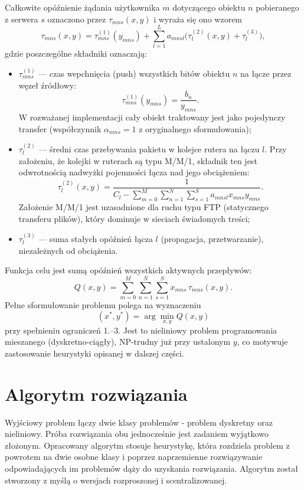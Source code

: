 \documentclass{article}
\begin{document}
Całkowite opóźnienie żądania użytkownika $m$ dotyczącego obiektu $n$ pobieranego z serwera $s$ oznaczono przez $\tau_{mns}(x,y)$ i wyraża się ono wzorem
\[
\tau_{mns}(x,y) = \tau^{(1)}_{mns}(y_{mns}) + \sum_{l=1}^L a_{mnsl}\Big(\tau^{(2)}_l(x,y) + \tau^{(3)}_l\Big),
\]
gdzie poszczególne składniki oznaczają:
\begin{itemize}
    \item $\tau^{(1)}_{mns}$ — czas wepchnięcia (push) wszystkich bitów obiektu $n$ na łącze przez węzeł źródłowy:
        \[\tau^{(1)}_{mns}(y_{mns}) = \frac{b_n}{y_{mns}}.\]
        W rozważanej implementacji cały obiekt traktowany jest jako pojedynczy transfer (współczynnik $\alpha_{mns}=1$ z oryginalnego sformułowania);
    \item $\tau^{(2)}_l$ — średni czas przebywania pakietu w kolejce rutera na łączu $l$. Przy założeniu, że kolejki w ruterach są typu M/M/1, składnik ten jest odwrotnością nadwyżki pojemności łącza nad jego obciążeniem:
        \[\tau^{(2)}_l(x,y) = \frac{1}{C_l - \sum^M_{m=0}\sum^N_{n=1}\sum^S_{s=1}a_{mnsl}x_{mns}y_{mns}}.\]
        Założenie M/M/1 jest uzasadnione dla ruchu typu FTP (statycznego transferu plików), który dominuje w sieciach świadomych treści;
    \item $\tau^{(3)}_l$ — suma stałych opóźnień łącza $l$ (propagacja, przetwarzanie), niezależnych od obciążenia.
\end{itemize}

Funkcja celu jest sumą opóźnień wszystkich aktywnych przepływów:
\[
Q(x,y) = \sum^M_{m=0}\sum^N_{n=1}\sum^S_{s=1}x_{mns}\,\tau_{mns}(x,y).
\]
Pełne sformułowanie problemu polega na wyznaczeniu
\[
(x^*,y^*) = \arg\min_{x,y} Q(x,y)
\]
przy spełnieniu ograniczeń 1.--3. Jest to nieliniowy problem programowania mieszanego (dyskretno-ciągły), NP-trudny już przy ustalonym $y$, co motywuje zastosowanie heurystyki opisanej w dalszej części.

\section{Algorytm rozwiązania}
Wyjściowy problem łączy dwie klasy problemów - problem dyskretny oraz nieliniowy. Próba rozwiązania obu jednocześnie jest zadaniem wyjątkowo złożonym. Opracowany algorytm stosuje heurystykę, która rozdziela problem z powrotem na dwie osobne klasy i poprzez naprzemienne rozwiązywanie odpowiadających im problemów dąży do uzyskania rozwiązania. Algorytm został stworzony z myślą o wersjach rozproszonej i scentralizowanej.
\end{document}
